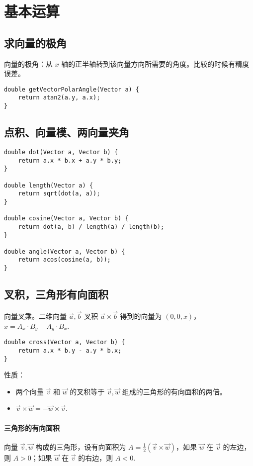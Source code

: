 \section{基本运算}
\subsection{求向量的极角}
向量的极角：从 $x$ 轴的正半轴转到该向量方向所需要的角度。比较的时候有精度误差。
\begin{verbatim}
double getVectorPolarAngle(Vector a) {
    return atan2(a.y, a.x);
} 
\end{verbatim}

\subsection{点积、向量模、两向量夹角}
\begin{verbatim}
double dot(Vector a, Vector b) {
    return a.x * b.x + a.y * b.y;
}

double length(Vector a) {
    return sqrt(dot(a, a)); 
} 

double cosine(Vector a, Vector b) {
    return dot(a, b) / length(a) / length(b);
}

double angle(Vector a, Vector b) {
    return acos(cosine(a, b));
}
\end{verbatim}


\subsection{叉积，三角形有向面积}
向量叉乘。二维向量 $\vec{a}, \vec{b}$ 叉积 $\vec{a} \times \vec{b}$ 得到的向量为 $(0, 0, x)$，$x = A_x \cdot B_y - A_y \cdot B_x$.
\begin{verbatim}
double cross(Vector a, Vector b) {
    return a.x * b.y - a.y * b.x;
}
\end{verbatim}

\par 性质：
\begin{itemize}
    \item 两个向量 $\vec{v}$ 和 $\vec{w}$ 的叉积等于 $\vec{v}, \vec{w}$ 组成的三角形的有向面积的两倍。
    \item $\vec{v} \times \vec{w} = -\vec{w} \times \vec{v}$.
\end{itemize}

\paragraph{三角形的有向面积}
向量 $\vec{v}, \vec{w}$ 构成的三角形，设有向面积为 $A=\frac{1}{2}(\vec{v} \times \vec{w})$，如果 $\vec{w}$ 在 $\vec{v}$ 的左边，则 $A > 0$；如果 $\vec{w}$ 在 $\vec{v}$ 的右边，则 $A < 0$.

